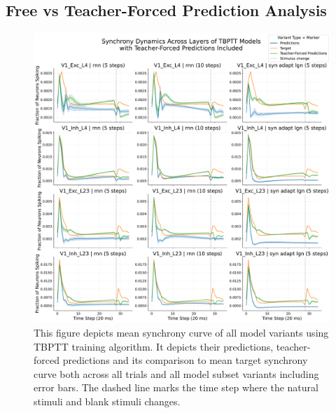 \subsection{Free vs Teacher-Forced Prediction Analysis}
\label{{subsec:free_vs_teacher_forced_predictions}}
\begin{figure}
    \centering
    \includegraphics[width=\linewidth]{img/plots/tbptt_models_forced_included_model_synchrony_curve.pdf}
    \caption{This figure depicts mean synchrony curve of all model variants using TBPTT training algorithm. It depicts their predictions, teacher-forced predictions and its comparison to mean target synchrony curve both across all trials and all model subset variants including error bars. The dashed line marks the time step where the natural stimuli and blank stimuli changes.}
    \label{fig:free_vs_teacher_forced_synchrony}
\end{figure}

